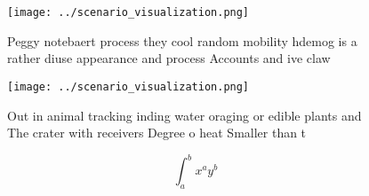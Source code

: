 \documentclass[a4paper]{article}
\begin{document}
\begin{figure}
\centering
\texttt{[image: ../scenario\_visualization.png]}
\caption{Peggy notebaert process they cool random mobility hdemog is a rather diuse appearance and process Accounts and ive claw
}
\end{figure}
 
\begin{figure}
\centering
\texttt{[image: ../scenario\_visualization.png]}
\caption{Out in animal tracking inding water oraging or edible plants and The crater with receivers Degree o heat Smaller than t
}
\end{figure}
 
\[ \int_{a}^{b}{x^{a}y^{b}} \]
\end{document}
